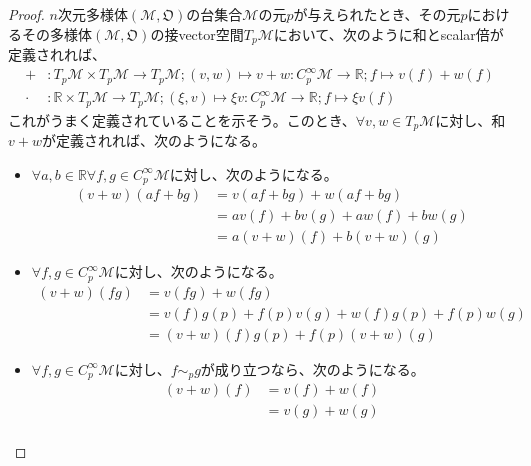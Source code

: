 \documentclass[dvipdfmx]{jsarticle}
\begin{document}
\begin{proof}
  $n$次元多様体$\left(\mathcal{M},\mathfrak{O}\right)$の台集合$\mathcal{M}$の元$p$が与えられたとき、その元$p$におけるその多様体$\left( \mathcal{M},\mathfrak{O} \right) $の接vector空間$T_p \mathcal{M}$において、次のように和とscalar倍が定義されれば、
  \begin{align*}
    +&:T_p \mathcal{M} \times T_p \mathcal{M} \rightarrow T_p \mathcal{M} ; \left( v,w\right) \mapsto v+w:C^\infty_p \mathcal{M} \rightarrow \mathbb{R} ; f\mapsto v\left(f\right) +w\left(f\right) \\
    \cdot &: \mathbb{R} \times T_p \mathcal{M} \rightarrow T_p \mathcal{M} ; \left( \xi,v\right) \mapsto \xi v:C^\infty_p \mathcal{M} \rightarrow \mathbb{R} ; f\mapsto \xi v\left(f\right) 
  \end{align*}
  これがうまく定義されていることを示そう。このとき、$\forall v,w\in T_p \mathcal{M}$に対し、和$v+w$が定義されれば、次のようになる。
  \begin{itemize}
    \item $\forall a,b\in \mathbb{R} \forall f,g\in C^\infty_p \mathcal{M}$に対し、次のようになる。
    \begin{align*}
      \left(v+w\right) \left(af+bg\right) &= v \left(af+bg\right) +w\left(af+bg\right) \\
      &= av\left(f\right) +bv\left(g\right) +aw\left(f\right) +bw\left(g\right) \\
      &= a\left(v+w\right) \left(f\right) +b\left(v+w\right) \left(g\right)
    \end{align*}
    \item $\forall f,g\in C^\infty_p \mathcal{M}$に対し、次のようになる。
    \begin{align*}
      \left(v+w\right) \left(fg\right) &= v \left(fg\right) +w\left(fg\right) \\
      &= v\left(f\right) g\left(p\right) +f\left(p\right) v\left(g\right) +w\left(f\right) g\left(p\right) +f\left(p\right) w\left(g\right) \\
      &= \left(v+w\right)\left(f\right) g\left(p\right) +f\left(p\right) \left(v+w\right)\left(g\right) 
    \end{align*}
    \item $\forall f,g\in C^\infty_p \mathcal{M}$に対し、$f\sim_p g$が成り立つなら、次のようになる。
    \begin{align*}
      \left(v+w\right) \left(f\right) &= v \left(f\right) +w\left(f\right) \\
      &=v\left(g\right) +w\left(g\right) \\ 

\end{align*}
\end{itemize}
\end{proof}
\end{document}
